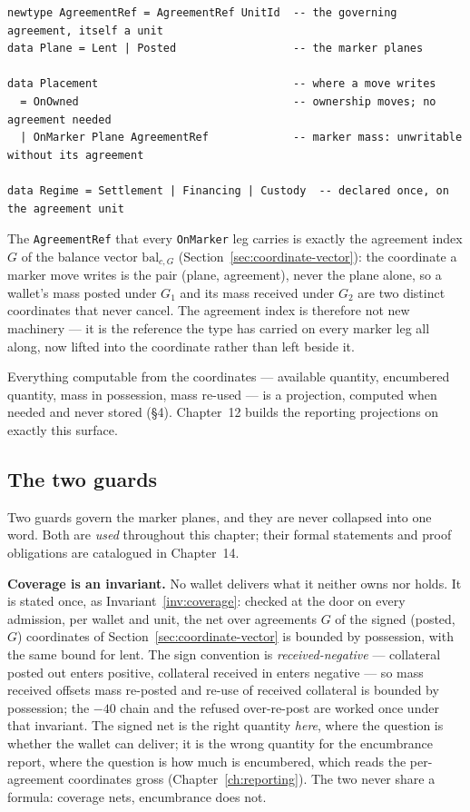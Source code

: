\documentclass[11pt,a4paper]{article}
\begin{document}
\begin{lstlisting}
newtype AgreementRef = AgreementRef UnitId  -- the governing agreement, itself a unit
data Plane = Lent | Posted                  -- the marker planes

data Placement                              -- where a move writes
  = OnOwned                                 -- ownership moves; no agreement needed
  | OnMarker Plane AgreementRef             -- marker mass: unwritable without its agreement

data Regime = Settlement | Financing | Custody  -- declared once, on the agreement unit
\end{lstlisting}

The \texttt{AgreementRef} that every \texttt{OnMarker} leg carries is exactly the
agreement index $G$ of the balance vector $\mathrm{bal}_{c,G}$
(Section~\ref{sec:coordinate-vector}): the coordinate a marker move writes is the
pair (plane, agreement), never the plane alone, so a wallet's mass posted under $G_1$ and
its mass received under $G_2$ are two distinct coordinates that never cancel. The agreement
index is therefore not new machinery --- it is the reference the type has carried on every
marker leg all along, now lifted into the coordinate rather than left beside it.

Everything computable from the coordinates --- available quantity, encumbered
quantity, mass in possession, mass re-used --- is a projection, computed when
needed and never stored (\S4). Chapter~12 builds the reporting projections on
exactly this surface.

\subsection{The two guards}

Two guards govern the marker planes, and they are never collapsed into one
word. Both are \emph{used} throughout this chapter; their formal statements and
proof obligations are catalogued in Chapter~14.

\textbf{Coverage is an invariant.} No wallet delivers what it neither owns nor
holds. It is stated once, as Invariant~\ref{inv:coverage}: checked at the door on
every admission, per wallet and unit, the net over agreements $G$ of the signed
(posted, $G$) coordinates of Section~\ref{sec:coordinate-vector} is bounded by
possession, with the same bound for lent. The sign convention is
\emph{received-negative} --- collateral posted out enters positive, collateral
received in enters negative --- so mass received offsets mass re-posted and re-use
of received collateral is bounded by possession; the $-40$ chain and the refused
over-re-post are worked once under that invariant. The signed net is the right
quantity \emph{here}, where the question is whether the wallet can deliver; it is
the wrong quantity for the encumbrance report, where the question is how much is
encumbered, which reads the per-agreement coordinates gross
(Chapter~\ref{ch:reporting}). The two never share a formula: coverage nets,
encumbrance does not.
\end{document}
